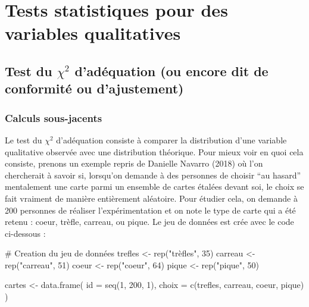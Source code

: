 \documentclass[
  letterpaper,
]{book}
\newenvironment{Shaded}{\begin{snugshade}}{\end{snugshade}}
\newcommand{\AttributeTok}[1]{\textcolor[rgb]{0.40,0.45,0.13}{#1}}
\newcommand{\CommentTok}[1]{\textcolor[rgb]{0.37,0.37,0.37}{#1}}
\newcommand{\DecValTok}[1]{\textcolor[rgb]{0.68,0.00,0.00}{#1}}
\newcommand{\FunctionTok}[1]{\textcolor[rgb]{0.28,0.35,0.67}{#1}}
\newcommand{\NormalTok}[1]{\textcolor[rgb]{0.00,0.23,0.31}{#1}}
\newcommand{\OtherTok}[1]{\textcolor[rgb]{0.00,0.23,0.31}{#1}}
\newcommand{\StringTok}[1]{\textcolor[rgb]{0.13,0.47,0.30}{#1}}
\begin{document}
\chapter{Tests statistiques pour des variables
qualitatives}\label{tests-statistiques-pour-des-variables-qualitatives}

\section{\texorpdfstring{Test du \(\chi^2\) d'adéquation (ou encore dit
de conformité ou
d'ajustement)}{Test du \textbackslash chi\^{}2 d'adéquation (ou encore dit de conformité ou d'ajustement)}}\label{test-du-chi2-daduxe9quation-ou-encore-dit-de-conformituxe9-ou-dajustement}

\subsection{Calculs sous-jacents}\label{calculs-sous-jacents}

Le test du \(\chi^2\) d'adéquation consiste à comparer la distribution
d'une variable qualitative observée avec une distribution théorique.
Pour mieux voir en quoi cela consiste, prenons un exemple repris de
Danielle Navarro (2018) où l'on chercherait à savoir si, lorsqu'on
demande à des personnes de choisir ``au hasard'' mentalement une carte
parmi un ensemble de cartes étalées devant soi, le choix se fait
vraiment de manière entièrement aléatoire. Pour étudier cela, on demande
à 200 personnes de réaliser l'expérimentation et on note le type de
carte qui a été retenu : coeur, trèfle, carreau, ou pique. Le jeu de
données est crée avec le code ci-dessous :

\begin{Shaded}
\begin{Highlighting}[]
\CommentTok{\# Creation du jeu de données}
\NormalTok{trefles }\OtherTok{\textless{}{-}} \FunctionTok{rep}\NormalTok{(}\StringTok{"trèfles"}\NormalTok{, }\DecValTok{35}\NormalTok{)}
\NormalTok{carreau }\OtherTok{\textless{}{-}} \FunctionTok{rep}\NormalTok{(}\StringTok{"carreau"}\NormalTok{, }\DecValTok{51}\NormalTok{)}
\NormalTok{coeur }\OtherTok{\textless{}{-}} \FunctionTok{rep}\NormalTok{(}\StringTok{"coeur"}\NormalTok{, }\DecValTok{64}\NormalTok{)}
\NormalTok{pique }\OtherTok{\textless{}{-}} \FunctionTok{rep}\NormalTok{(}\StringTok{"pique"}\NormalTok{, }\DecValTok{50}\NormalTok{)}

\NormalTok{cartes }\OtherTok{\textless{}{-}} \FunctionTok{data.frame}\NormalTok{(}
  \AttributeTok{id =} \FunctionTok{seq}\NormalTok{(}\DecValTok{1}\NormalTok{, }\DecValTok{200}\NormalTok{, }\DecValTok{1}\NormalTok{), }
  \AttributeTok{choix =} \FunctionTok{c}\NormalTok{(trefles, carreau, coeur, pique)}
\NormalTok{  )}
\end{Highlighting}
\end{Shaded}
\end{document}
